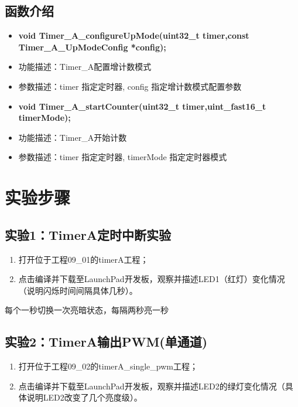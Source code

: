 \documentclass[a4paper,10pt,UTF8]{paper}
\numberwithin{equation}{section}
\numberwithin{figure}{section}
\begin{document}
\subsection{函数介绍}

\begin{itemize}
  \item \textbf{void Timer\_A\_configureUpMode(uint32\_t timer,const Timer\_A\_UpModeConfig *config);}
  \item 功能描述：Timer\_A配置增计数模式
  \item 参数描述：timer   指定定时器, config  指定增计数模式配置参数
\end{itemize}

\begin{itemize}
  \item \textbf{void Timer\_A\_startCounter(uint32\_t timer,uint\_fast16\_t timerMode);   }
  \item 功能描述：Timer\_A开始计数
  \item 参数描述：timer   指定定时器, timerMode  指定定时器模式
\end{itemize}

\section{实验步骤}

\subsection{实验1：TimerA定时中断实验}

\begin{enumerate}
  \item 打开位于工程09\_01的timerA工程；
  \item 点击编译并下载至LaunchPad开发板，观察并描述LED1（红灯）变化情况（说明闪烁时间间隔具体几秒）。
\end{enumerate}

每个一秒切换一次亮暗状态，每隔两秒亮一秒

\subsection{实验2：TimerA输出PWM(单通道)}

\begin{enumerate}
  \item 打开位于工程09\_02的timerA\_single\_pwm工程；
  \item 点击编译并下载至LaunchPad开发板，观察并描述LED2的绿灯变化情况（具体说明LED2改变了几个亮度级）。
\end{enumerate}
\end{document}
